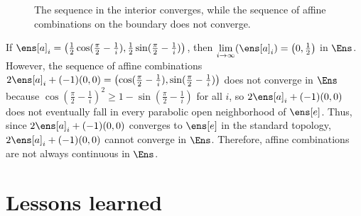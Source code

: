 \begin{example}
	\begin{figure}[H]
		\centering
		\caption{The sequence in the interior converges, while the sequence of affine combinations on the boundary does not converge.}
	\end{figure}
	
	If $\ens[a]_i = \left(\frac{1}{2}\cos(\frac{\pi}{2} - \frac{1}{i}), \frac{1}{2}\sin(\frac{\pi}{2} - \frac{1}{i})\right)$, then $\lim\limits_{i \to \infty}(\ens[a]_i) = \left(0, \frac{1}{2}\right)$ in $\Ens$. However, the sequence of affine combinations $2\ens[a]_i + (-1)(0,0) = \left(\cos(\frac{\pi}{2} - \frac{1}{i}), \sin(\frac{\pi}{2} - \frac{1}{i})\right)$ does not converge in $\Ens$ because $\cos(\frac{\pi}{2} - \frac{1}{i})^2 \ge 1 - \sin(\frac{\pi}{2} - \frac{1}{i})$ for all $i$, so $2\ens[a]_i + (-1)(0,0)$ does not eventually fall in every parabolic open neighborhood of $\ens[e]$. Thus, since $2\ens[a]_i + (-1)(0,0)$ converges to $\ens[e]$ in the standard topology, $2\ens[a]_i + (-1)(0,0)$ cannot converge in $\Ens$. Therefore, affine combinations are not always continuous in $\Ens$.
\end{example}

\section{Lessons learned}

